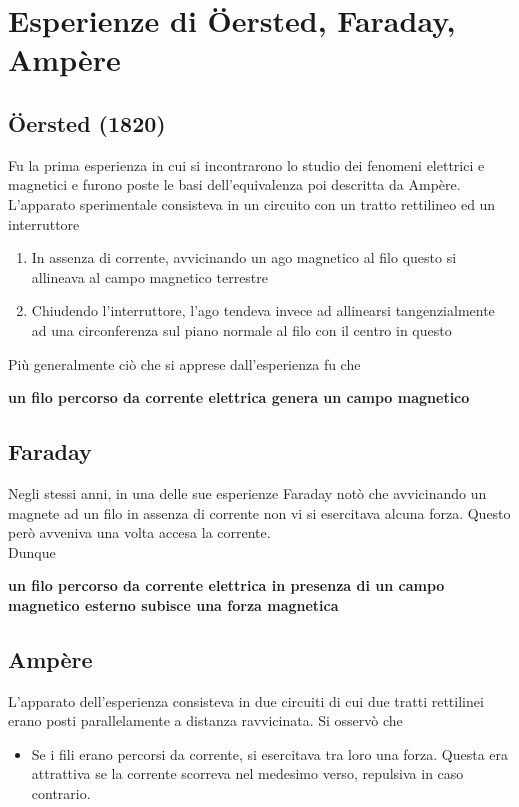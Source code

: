 \section{Esperienze di \"Oersted, Faraday, Ampère}

\subsection{\"Oersted (1820)}
Fu la prima esperienza in cui si incontrarono lo studio dei fenomeni elettrici e magnetici e furono poste le basi dell'equivalenza poi descritta da Ampère.
\\L'apparato sperimentale consisteva in un circuito con un tratto rettilineo ed un interruttore
\begin{enumerate}
\item In assenza di corrente, avvicinando un ago magnetico al filo questo si allineava al campo magnetico terrestre
\item Chiudendo l'interruttore, l'ago tendeva invece ad allinearsi tangenzialmente ad una circonferenza sul piano normale al filo con il centro in questo
\end{enumerate}
Più generalmente ciò che si apprese dall'esperienza fu che 
\begin{center}

\textbf{un filo percorso da corrente elettrica genera un campo magnetico}

\end{center}

\subsection{Faraday}
Negli stessi anni, in una delle sue esperienze Faraday notò che avvicinando un magnete ad un filo in assenza di corrente non vi si esercitava alcuna forza. Questo però avveniva una volta accesa la corrente. 
\\Dunque 
\begin{center}
\textbf{un filo percorso da corrente elettrica in presenza di un campo magnetico esterno subisce una forza magnetica}
\end{center}

\subsection{Ampère}
L'apparato dell'esperienza consisteva in due circuiti di cui due tratti rettilinei erano posti parallelamente a distanza ravvicinata. Si osservò che
\begin{itemize}
\item Se i fili erano percorsi da corrente, si esercitava tra loro una forza. Questa era attrattiva se la corrente scorreva nel medesimo verso, repulsiva in caso contrario.
\end{itemize}

